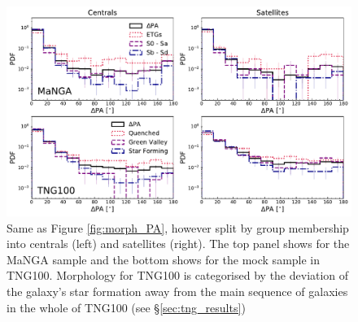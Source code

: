 \begin{figure}
    \centering
	\includegraphics[width=\linewidth]{misalignment_MaNGA/MPL8_TNG_morph_group_PA.pdf}
    \caption{Same as Figure \ref{fig:morph_PA}, however split by group membership into centrals (left) and satellites (right). The top panel shows for the MaNGA sample and the bottom shows for the mock sample in TNG100. Morphology for TNG100 is categorised by the deviation of the galaxy's star formation away from the main sequence of galaxies in the whole of TNG100 (see \S\ref{sec:tng_results})}
    \label{fig:group_morph_PA}
\end{figure}

